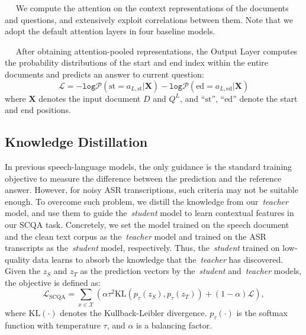 \documentclass[11pt]{article}
\newcommand{\myparagraph}[1]{\vspace{2pt}\noindent{\bf{#1}}~~}
\begin{document}
\myparagraph{Attention Layer.}
We compute the attention on the context representations of the documents and questions, and extensively exploit correlations between them. Note that we adopt the default attention layers in four baseline models.

\myparagraph{Output Layer.}
After obtaining attention-pooled representations, the Output Layer computes the probability distributions of the start and end index within the entire documents and predicts an answer to current question:
\begin{equation}
    \mathcal{L}=
     -\texttt{log}\mathcal{P}(\text{st}=a_{L,\text{st}}|\mathbf{X}) - \texttt{log}\mathcal{P}(\text{ed}=a_{L,\text{ed}}|\mathbf{X})
\end{equation}
where $\mathbf{X}$ denotes the input document $D$ and $Q^{L}$, and ``$\text{st}$'', ``$\text{ed}$'' denote the start and end positions.

\vspace{-0.5em}
\subsection{Knowledge Distillation}
\vspace{-0.5em}
\label{subsec:kd}
In previous speech-language models, the only guidance is the standard training objective to measure the difference between the prediction and the reference answer. However, for noisy ASR transcriptions, such criteria may not be suitable enough. To overcome such problem, we distill the knowledge from our~\textit{teacher} model, and use them to guide the~\textit{student} model to learn contextual features in our SCQA task. Concretely, we set the model trained on the speech document and the clean text corpus as the~\textit{teacher} model and trained on the ASR transcripts as the~\textit{student} model, respectively. Thus, the~\textit{student} trained on low-quality data learns to absorb the knowledge that the~\textit{teacher} has discovered. Given the $z_{S}$ and $z_{T}$ as the prediction vectors by the~\textit{student} and~\textit{teacher} models, the objective is defined as:
\begin{equation}
    \mathcal{L}_{\text{SCQA}} \!\!=\!\!\sum_{x\in \mathcal{X}} (\alpha \tau^2 \text{KL}(p_{\tau}(z_{S}), p_{\tau}(z_{T})) + (1 - \alpha) \mathcal{L}),
\end{equation}
where $\text{KL}(\cdot)$ denotes the Kullback-Leibler divergence. $p_{\tau}(\cdot)$ is the softmax function with temperature $\tau$, and $\alpha$ is a  balancing factor.
\end{document}
